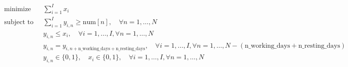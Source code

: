 \documentclass{article}
\begin{document}
\begin{align*}
\text{minimize} \quad & \sum_{i=1}^{I} x_i \\
\text{subject to} \quad & \sum_{i=1}^{I} y_{i, n} \geq \text{num}[n], \quad \forall n = 1, \ldots, N \\
& y_{i, n} \leq x_i, \quad \forall i = 1, \ldots, I, \forall n = 1, \ldots, N \\
& y_{i, n} = y_{i, n+\text{n\_working\_days} + \text{n\_resting\_days}}, \quad \forall i = 1, \ldots, I, \forall n = 1, \ldots, N - (\text{n\_working\_days} + \text{n\_resting\_days}) \\
& y_{i, n} \in \{0, 1\}, \quad x_i \in \{0, 1\}, \quad \forall i = 1, \ldots, I, \forall n = 1, \ldots, N
\end{align*}
\end{document}
